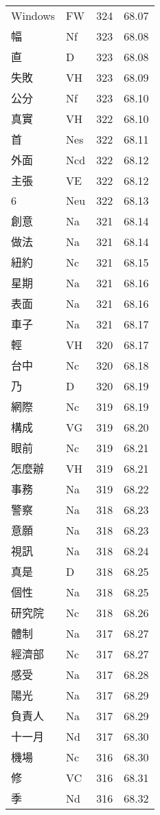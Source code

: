 \documentclass[twocolumn]{book}
\begin{document}
\begin{supertabular}{llrr}
Windows & FW & 324 &  68.07\\
幅 & Nf & 323 &  68.08\\
直 & D & 323 &  68.08\\
失敗 & VH & 323 &  68.09\\
公分 & Nf & 323 &  68.10\\
真實 & VH & 322 &  68.10\\
首 & Nes & 322 &  68.11\\
外面 & Ncd & 322 &  68.12\\
主張 & VE & 322 &  68.12\\
6 & Neu & 322 &  68.13\\
創意 & Na & 321 &  68.14\\
做法 & Na & 321 &  68.14\\
紐約 & Nc & 321 &  68.15\\
星期 & Na & 321 &  68.16\\
表面 & Na & 321 &  68.16\\
車子 & Na & 321 &  68.17\\
輕 & VH & 320 &  68.17\\
台中 & Nc & 320 &  68.18\\
乃 & D & 320 &  68.19\\
網際 & Nc & 319 &  68.19\\
構成 & VG & 319 &  68.20\\
眼前 & Nc & 319 &  68.21\\
怎麼辦 & VH & 319 &  68.21\\
事務 & Na & 319 &  68.22\\
警察 & Na & 318 &  68.23\\
意願 & Na & 318 &  68.23\\
視訊 & Na & 318 &  68.24\\
真是 & D & 318 &  68.25\\
個性 & Na & 318 &  68.25\\
研究院 & Nc & 318 &  68.26\\
體制 & Na & 317 &  68.27\\
經濟部 & Nc & 317 &  68.27\\
感受 & Na & 317 &  68.28\\
陽光 & Na & 317 &  68.29\\
負責人 & Na & 317 &  68.29\\
十一月 & Nd & 317 &  68.30\\
機場 & Nc & 316 &  68.30\\
修 & VC & 316 &  68.31\\
季 & Nd & 316 &  68.32\\

\end{supertabular}
\end{document}
